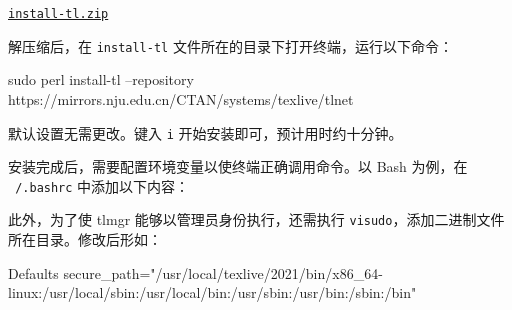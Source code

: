 \medskip
\href{https://mirrors.nju.edu.cn/CTAN/systems/texlive/tlnet/install-tl.zip}{\faFile*[regular] \texttt{install-tl.zip}}
\medskip

\begin{widepar}
解压缩后，在 \texttt{install-tl} 文件所在的目录下打开终端，运行以下命令：

\begin{shellexample}[morekeywords={perl}]
  sudo perl install-tl --repository https://mirrors.nju.edu.cn/CTAN/systems/texlive/tlnet
\end{shellexample}

默认设置无需更改。键入 \texttt{i} 开始安装即可，预计用时约十分钟。

安装完成后，需要配置环境变量以使终端正确调用命令。以 Bash 为例，在 \texttt{~/.bashrc} 中添加以下内容：


此外，为了使 tlmgr 能够以管理员身份执行，还需执行 \texttt{visudo}，添加二进制文件所在目录。修改后形如：

\begin{textexample}
  Defaults secure_path="/usr/local/texlive/2021/bin/x86_64-linux:/usr/local/sbin:/usr/local/bin:/usr/sbin:/usr/bin:/sbin:/bin"
\end{textexample}

\end{widepar}
